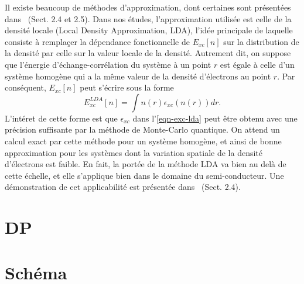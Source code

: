 Il existe beaucoup de méthodes d'approximation,
dont certaines sont présentées dans~\cite{Sot03} (Sect. 2.4 et 2.5).
Dans nos études, l'approximation utilisée est celle de la densité locale (Local Density Approximation, LDA),
l'idée principale de laquelle consiste à remplaçer la dépendance fonctionnelle de $E_{xc}[n]$
sur la distribution de la densité par celle sur la valeur locale de la densité.
Autrement dit, on suppose que l'énergie d'échange-corrélation du système à un point $r$
est égale à celle d'un système homogène qui a la même valeur de la densité d'électrons au point $r$.
Par conséquent, $E_{xc}[n]$ peut s'écrire sous la forme
\begin{equation}
  \label{eqn-exc-lda}
  E_{xc}^{LDA}[n] = \int n(r)\epsilon_{xc}(n(r)) dr.
\end{equation}
L'intéret de cette forme est que $\epsilon_{xc}$ dans l'\cref{eqn-exc-lda} peut être obtenu avec
une précision suffisante par la méthode de Monte-Carlo quantique.
On attend un calcul exact par cette méthode pour un système homogène,
et ainsi de bonne approximation pour les systèmes dont la variation spatiale de la densité d'électrons est faible.
En fait, la portée de la méthode LDA va bien au delà de cette échelle,
et elle s'applique bien dans le domaine du semi-conducteur.
Une démonstration de cet applicabilité est présentée dans~\cite{Sot03} (Sect. 2.4).

\section{DP}

\section{Schéma}

